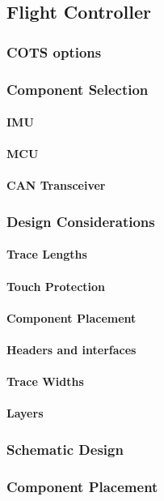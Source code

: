 \subsection{Flight Controller}
\subsubsection{\gls{COTS} options}
\subsubsection{Component Selection}
\paragraph{\gls{IMU}}
\paragraph{\gls{MCU}}
\paragraph{\gls{CAN} Transceiver}
\subsubsection{Design Considerations}
\paragraph{Trace Lengths}
\paragraph{Touch Protection}
\paragraph{Component Placement}
\paragraph{Headers and interfaces}
\paragraph{Trace Widths}
\paragraph{Layers}
\subsubsection{Schematic Design}
\subsubsection{Component Placement}

